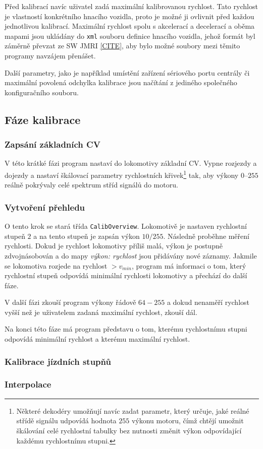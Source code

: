 Před kalibrací navíc uživatel zadá maximální kalibrovanou rychlost. Tato rychlost
je vlastností konkrétního hnacího vozidla, proto je možné ji ovlivnit před
každou jednotlivou kalibrací. Maximální rychlost spolu s akcelerací a decelerací
a oběma mapami jsou ukládány do \texttt{xml} souboru definice hnacího vozidla,
jehož formát byl záměrně převzat ze SW JMRI \ref{CITE}, aby bylo možné soubory
mezi těmito programy navzájem přenášet.

Další parametry, jako je například umístění zařízení sériového portu centrály
či maximální povolená odchylka kalibrace jsou načítání z jediného společného
konfiguračního souboru.

\subsection{Fáze kalibrace}

\subsubsection{Zapsání základních CV}

V této krátké fázi program nastaví do lokomotivy základní CV. Vypne rozjezdy a
dojezdy a nastaví škálovací parametry rychlostních křivek\footnote{Některé
dekodéry umožňují navíc zadat parametr, který určuje, jaké reálné střídě
signálu udpovídá hodnota $255$ výkonu motoru, čímž chtějí umožnit
škálování celé rychlostní tabulky bez nutnosti změnit výkon odpovídající
každému rychlostnímu stupni.} tak, aby výkony $0$--$255$ reálně pokrývaly celé
spektrum stříd signálů do motoru.


\subsubsection{Vytvoření přehledu}
O tento krok se stará třída \texttt{CalibOverview}.
Lokomotivě je nastaven rychlostní stupeň $2$ a na tento stupeň je zapsán výkon
$10/255$. Následně proběhne měření rychlosti. Dokud je rychlost lokomotivy příliš
malá, výkon je postupně zdvojnásobován a do mapy \textit{výkon: rychlost} jsou
přidávány nové záznamy. Jakmile se lokomotiva rozjede na rychlost $> v_{min}$,
program má informaci o tom, který rychlostní stupeň odpovídá minimální rychlosti
lokomotivy a přechází do další fáze.

V další fázi zkouší program výkony řádově $64-255$ a dokud nenaměří rychlost
vyšší než je uživatelem zadaná maximální rychlost, zkouší dál.

Na konci této fáze má program představu o tom, kterému rychlostnímu stupni
odpovídá minimální rychlost a kterému maximální rychlost.


\subsubsection{Kalibrace jízdních stupňů}

\subsubsection{Interpolace}

